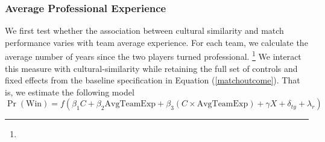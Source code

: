 \documentclass[10pt]{article}
\begin{document}
\subsubsection{Average Professional Experience} 










We first test whether the association between cultural similarity and match performance varies with team average experience. For each team, we calculate the average number of years since the two players turned professional. \footnote{} We interact this measure with cultural-similarity while retaining the full set of controls and fixed effects from the baseline specification in Equation (\ref{matchoutcome}). That is, we estimate the following model
\begin{equation}
\operatorname{Pr}(\text{Win}) = f(\beta_1 C + \beta_2 \text{AvgTeamExp} + \beta_3 (C \times \text{AvgTeamExp}) + \gamma X + \delta_{ty} + \lambda_r)
\end{equation}
\end{document}
